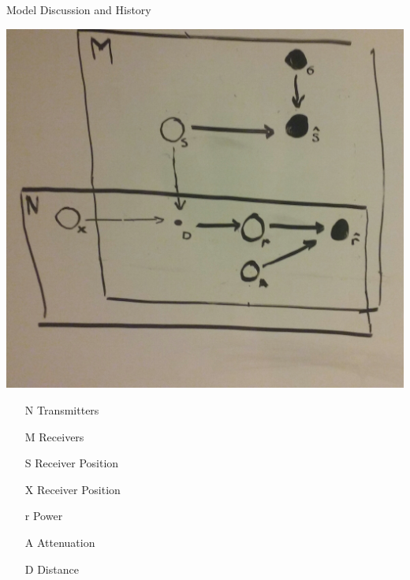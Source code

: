 \documentclass[11pt]{beamer}
\begin{document}
\begin{frame}{Model Discussion and History}
\begin{center}
\begin{multicols}{3}
\columnbreak
\includegraphics[height=0.3\textheight]{pictures/3plate.jpg}

\end{multicols}
\end{center}
\begin{itemize}
\item[N] Transmitters
\item[M] Receivers
\item[S] Receiver Position
\item[X] Receiver Position
\item[r] Power
\item[A] Attenuation
\item[D] Distance
\end{itemize}

\end{frame}
\end{document}
